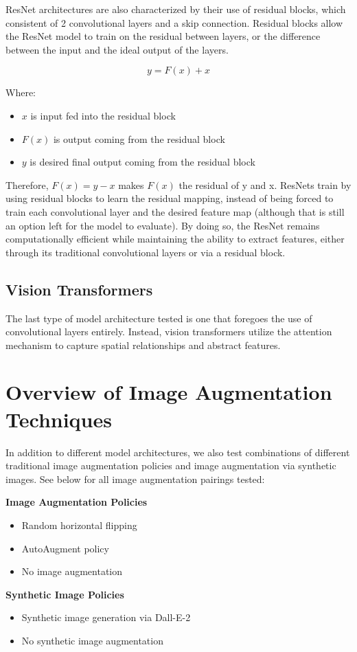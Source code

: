 \documentclass [MS] {uclathes}
\begin{document}
ResNet architectures are also characterized by their use of residual blocks, which consistent of 2 convolutional layers 
and a skip connection. Residual blocks allow the ResNet model to train on the residual between layers, or the difference 
between the input and the ideal output of the layers. 

\[y = F(x) + x\]

Where:
\begin{itemize}
    \item \(x\) is input fed into the residual block
    \item \(F(x)\) is output coming from the residual block
    \item \(y\) is desired final output coming from the residual block
\end{itemize}

Therefore, \(F(x) = y - x\) makes \(F(x)\) the residual of y and x. ResNets train by using residual blocks to learn the 
residual mapping, instead of being forced to train each convolutional layer and the desired feature map (although that 
is still an option left for the model to evaluate). By doing so, the ResNet remains computationally efficient while 
maintaining the ability to extract features, either through its traditional convolutional layers or via a residual 
block. 

\section{Vision Transformers}
The last type of model architecture tested is one that foregoes the use of convolutional layers entirely. Instead, 
vision transformers utilize the attention mechanism to capture spatial relationships and abstract features.

\chapter{Overview of Image Augmentation Techniques}
In addition to different model architectures, we also test combinations of different traditional image augmentation 
policies and image augmentation via synthetic images. See below for all image augmentation pairings tested:

\begin{multicols}{2}
    \raggedcolumns
    \textbf{Image Augmentation Policies}
    \begin{itemize}
        \item Random horizontal flipping
        \item AutoAugment policy
        \item No image augmentation
    \end{itemize}
    
    \columnbreak
    
    \textbf{Synthetic Image Policies}
    \begin{itemize}
        \item Synthetic image generation via Dall-E-2
        \item No synthetic image augmentation
    \end{itemize}
\end{multicols}
\end{document}
